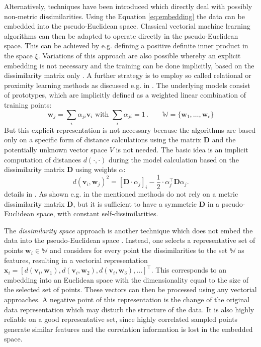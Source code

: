 \documentclass[twoside,11pt]{article}
\renewcommand{\v}[1]{\mathbf{#1}}
\begin{document}
Alternatively, techniques have been introduced which directly deal with possibly non-metric dissimilarities.
Using the Equation \eqref{eq:embedding} the data can be embedded into
the pseudo-Euclidean space.
Classical vectorial machine learning algorithms can then be adapted
to operate directly in the pseudo-Euclidean space.
This can be achieved by e.g. defining a positive definite
inner product in the space $\xi$.
Variations of this approach are also possible
whereby an explicit embedding is not necessary
and the training can be done implicitly,
based on the dissimilarity matrix only \cite{Pekalska2005a}.
A further strategy is to employ so called relational or proximity learning methods as discussed e.g. in \cite{Schleif2012k}.
The underlying models consist of prototypes,
which are implicitly defined as a weighted linear combination of training points: 
\begin{equation*}
	\v{w}_j=\sum_i\alpha_{ji}\v{v}_i\mbox{ with } \sum_i\alpha_{ji}=1\,. \qquad \mathbb{W}=\{\v{w}_1, \hdots, \v{w}_c\}
\end{equation*}
But this explicit representation is not necessary because the algorithms are based only 
on a specific form of distance calculations using the matrix $\mathbf{D}$ and
the potentially unknown vector space $V$ is not needed.
The basic idea is an implicit computation of distances $d(\cdot,\cdot)$
during the model calculation based on the dissimilarity matrix $\mathbf{D}$ using weights $\alpha$:
\begin{equation}
	d(\v{v}_i,\v{w}_j)^2=
	[\mathbf{D}\cdot\alpha_j]_i-\frac{1}{2}\cdot\alpha_j^\top \mathbf{D}\alpha_j
	\label{eq:rel_distance}.
\end{equation}
details in \cite{Schleif2012k}.
As shown e.g. in \cite{DBLP:journals/neco/HammerH10} the mentioned methods 
do not rely on a metric dissimilarity matrix $\mathbf{D}$,
but it is sufficient to have a symmetric $\mathbf{D}$ in a pseudo-Euclidean space,
with constant self-dissimilarities.

The \emph{dissimilarity space} approach is another technique
which does not embed the data into the pseudo-Euclidean space \cite{Pekalska2005a}.
Instead, one selects a representative set of points $\v{w}_i \in \mathbb{W}$
and considers for every point the dissimilarities to the set $\mathbb{W}$
as features, resulting in a vectorial representation
$\mathbf{x}_i=[d(\v{v}_i,\v{w}_1),d(\v{v}_i,\v{w}_2),d(\v{v}_i,\v{w}_3),...]^\top$.
This corresponds to an embedding into an Euclidean space
with the dimensionality equal to the size of the selected set of points.
These vectors can then be processed using any vectorial approaches.
A negative point of this representation is the
change of the original data representation
which may disturb the structure of the data.
It is also highly reliable on a good representative set,
since highly correlated sampled points generate similar features
and the correlation information is lost in the embedded space.
\end{document}
